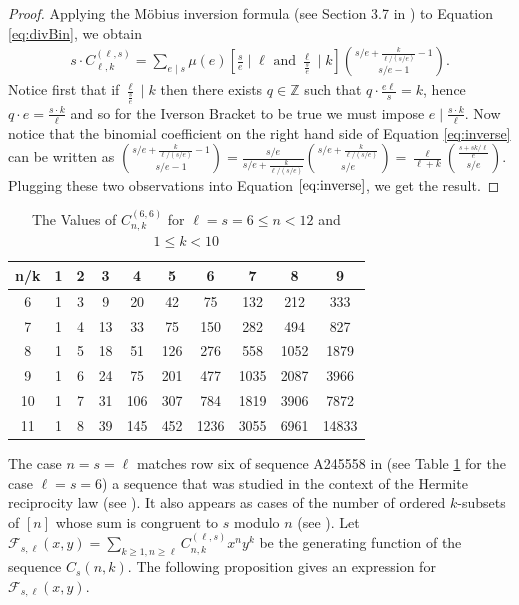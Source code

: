 \documentclass[12pt]{amsart}
\begin{document}
\begin{proof}
    
    Applying the Möbius inversion formula (see Section 3.7 in \cite{Stanley_2023}) to Equation \ref{eq:divBin}, we obtain
    \begin{align}
    \label{eq:inverse}
        s\cdot C^{(\ell,s)}_{\ell,k} = \sum _{e \mid s}\mu (e)\left[\frac{s}{e}\mid \ell \text{ and }\frac{\ell}{\frac{s}{e}}\mid k\right ]\binom{s/e+\frac{k}{\ell/(s/e)}-1}{s/e-1}.
    \end{align}
    Notice first that if $\frac{\ell}{\frac{s}{e}}\mid k$ then there exists $q\in \mathbb{Z}$ such that $q\cdot \frac{e\ell}{s}=k$, hence $q\cdot e = \frac{s\cdot k}{\ell}$ and so for the Iverson Bracket to be true we must impose $e \mid \frac{s\cdot k}{\ell}$. Now notice that the binomial coefficient on the right hand side of Equation \ref{eq:inverse} can be written as
    $\binom{s/e+\frac{k}{\ell/(s/e)}-1}{s/e-1} = \frac{s/e}{s/e+\frac{k}{\ell/(s/e)}}\binom{s/e+\frac{k}{\ell/(s/e)}}{s/e} =\frac{\ell}{\ell+k}\binom{\frac{s+sk/\ell}{e}}{s/e}$. Plugging these two observations into Equation $\ref{eq:inverse}$, we get the result.
\end{proof}
\begin{table}[!ht]
        \centering
        
        \begin{tabular}{|c|ccccccccc|}
        \hline
        n/k&1&2&3&4&5&6&7&8&9\\
        \hline
                6 & 1&3&9&20&42&75&132&212&333\\

7 & 1&4&13&33&75&150&282&494&827\\

8 & 1&5&18&51&126&276&558&1052&1879\\

9 & 1&6&24&75&201&477&1035&2087&3966\\

10 & 1&7&31&106&307&784&1819&3906&7872\\

11 & 1&8&39&145&452&1236&3055&6961&14833\\
             \hline
        \end{tabular}
        \caption{The Values of $C^{(6,6)}_{n,k}$ for $\ell=s=6 \leq n<12$ and $1\leq k<10$}
        \label{tab:C2}
    \end{table}
The case $n=s=\ell$ matches row six of sequence A245558 in \cite{oeis} (see Table \ref{tab:C2} for the case $\ell = s=6$) a sequence that was studied in the context of the Hermite reciprocity law (see \cite{Elashvili1999}). It also appears as cases of the number of ordered $k$-subsets of $[n]$ whose sum is congruent to $s$ modulo $n$ (see \cite{broadhurst2025}). Let  $\mathcal{F}_{s,\ell}(x, y) = \sum_{k \ge 1,n \ge \ell} C^{(\ell,s)}_{n,k}x^ny^k$ be the generating function of the sequence $C_s(n,k)$. The following proposition gives an expression for $\mathcal{F}_{s,\ell}(x,y)$.
\end{document}
